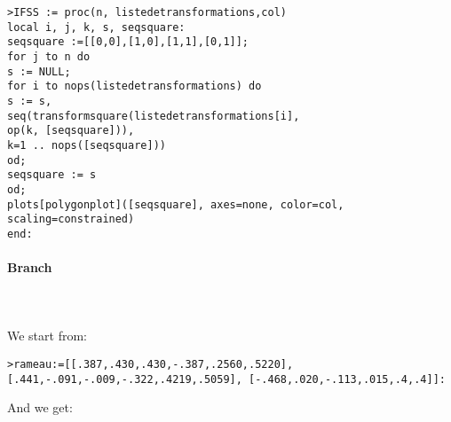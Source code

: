 	\texttt{>IFSS := proc(n, liste\textunderscore de\textunderscore transformations,col)}\\
     \texttt{local i, j, k, s, seq\textunderscore square:}\\
     \texttt{seq\textunderscore square :=[[0,0],[1,0],[1,1],[0,1]];}\\
     \texttt{for j to n do}\\
     \texttt{s := NULL;}\\
     \texttt{for i to nops(liste\textunderscore de\textunderscore transformations) do}\\
        \texttt{s := s,}\\
        \texttt{seq(transform\textunderscore square(liste\textunderscore de\textunderscore transformations[i],}\\
        \texttt{op(k, [seq\textunderscore square])),}\\
        \texttt{k=1 .. nops([seq\textunderscore square]))}\\
      \texttt{od;}\\
      \texttt{seq\textunderscore square := s }\\
    \texttt{od;}\\
   \texttt{plots[polygonplot]([seq\textunderscore square], axes=none, color=col, scaling=constrained)}\\
  \texttt{end:}\\
	
	\paragraph{Branch}\mbox{}\\\\
	We start from:
	
	\texttt{>rameau:=[[.387,.430,.430,-.387,.2560,.5220], }\\
	\texttt{[.441,-.091,-.009,-.322,.4219,.5059], [-.468,.020,-.113,.015,.4,.4]]:}

	And we get:

